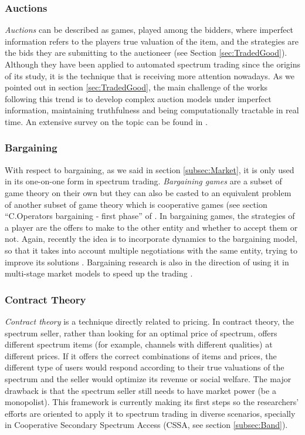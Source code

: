 \subsubsection{Auctions}
\textit{Auctions} can be described as games, played among the bidders, where imperfect information refers to the players true valuation of the item, and the strategies are the bids they are submitting to the auctioneer (see Section \ref{sec:TradedGood}). 
Although they have been applied to automated spectrum trading since the origins of its study, it is the technique that is receiving more attention nowadays. 
As we pointed out in section \ref{sec:TradedGood}, the main challenge of the works following this trend is to develop complex auction models under imperfect information, maintaining truthfulness and being computationally tractable in real time. 
An extensive survey on the topic can be found in \cite{ref:Zhang2012}.

\subsubsection{Bargaining}
With respect to bargaining, as we said in section \ref{subsec:Market}, it is only used in its one-on-one form in spectrum trading. 
\textit{Bargaining games} are a subset of game theory on their own but they can also be casted to an equivalent problem of another subset of game theory which is cooperative games (see section ``C.Operators bargaining - first phase'' of \cite{ref:Guijarro2011}. 
In bargaining games, the strategies of a player are the offers to make to the other entity and whether to accept them or not. 
Again, recently the idea is to incorporate dynamics to the bargaining model, so that it takes into account multiple negotiations with the same entity, trying to improve its solutions \cite{ref:Yan2011,ref:Yan2012}. Bargaining research is also in the direction of using it in multi-stage market models to speed up the trading \cite{ref:Guijarro2011,ref:Xu2012}. 

\subsubsection{Contract Theory}
\textit{Contract theory} is a technique directly related to pricing.
In contract theory, the spectrum seller, rather than looking for an optimal price of spectrum, offers different spectrum items (for example, channels with different qualities) at different prices. 
If it offers the correct combinations of items and prices, the different type of users would respond according to their true valuations of the spectrum and the seller would optimize its revenue or social welfare.
The major drawback is that the spectrum seller still needs to have market power (be a monopolist).
This framework is currently making its first steps so the researchers' efforts are oriented to apply it to spectrum trading in diverse scenarios, specially in Cooperative Secondary Spectrum Access (CSSA, see section \ref{subsec:Band}).

